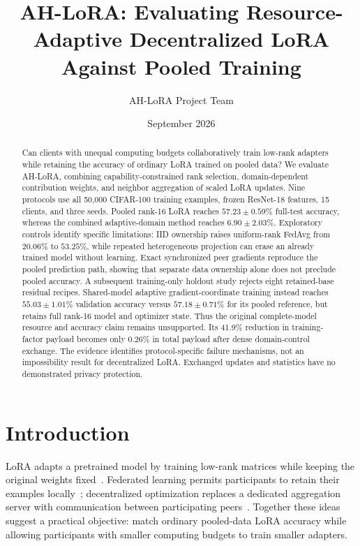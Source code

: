 \documentclass[11pt]{article}
\title{AH-LoRA: Evaluating Resource-Adaptive Decentralized LoRA Against Pooled Training}
\author{AH-LoRA Project Team}
\date{September 2026}
\begin{document}
\maketitle
\begin{abstract}
Can clients with unequal computing budgets collaboratively train low-rank adapters while retaining the accuracy of ordinary LoRA trained on pooled data? We evaluate AH-LoRA, combining capability-constrained rank selection, domain-dependent contribution weights, and neighbor aggregation of scaled LoRA updates. Nine protocols use all 50,000 CIFAR-100 training examples, frozen ResNet-18 features, 15 clients, and three seeds. Pooled rank-16 LoRA reaches $57.23\pm0.59\%$ full-test accuracy, whereas the combined adaptive-domain method reaches $6.90\pm2.03\%$. Exploratory controls identify specific limitations: IID ownership raises uniform-rank FedAvg from $20.06\%$ to $53.25\%$, while repeated heterogeneous projection can erase an already trained model without learning. Exact synchronized peer gradients reproduce the pooled prediction path, showing that separate data ownership alone does not preclude pooled accuracy. A subsequent training-only holdout study rejects eight retained-base residual recipes. Shared-model adaptive gradient-coordinate training instead reaches $55.03\pm1.01\%$ validation accuracy versus $57.18\pm0.71\%$ for its pooled reference, but retains full rank-16 model and optimizer state. Thus the original complete-model resource and accuracy claim remains unsupported. Its 41.9\% reduction in training-factor payload becomes only 0.26\% in total payload after dense domain-control exchange. The evidence identifies protocol-specific failure mechanisms, not an impossibility result for decentralized LoRA. Exchanged updates and statistics have no demonstrated privacy protection.
\end{abstract}

\section{Introduction}
LoRA adapts a pretrained model by training low-rank matrices while keeping the original weights fixed~\citep{hu2022lora}. Federated learning permits participants to retain their examples locally~\citep{mcmahan2017fedavg}; decentralized optimization replaces a dedicated aggregation server with communication between participating peers~\citep{boyd2006gossip,lian2017dpsgd}. Together these ideas suggest a practical objective: match ordinary pooled-data LoRA accuracy while allowing participants with smaller computing budgets to train smaller adapters.
\end{document}

